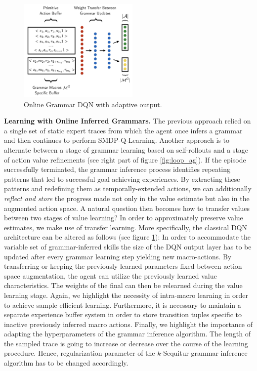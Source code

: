 \documentclass[colorinlistoftodos]{article}
\theoremstyle{definition}
\begin{document}
\begin{figure}
  \begin{center}
    \includegraphics[width=0.52\textwidth]{figures/ag_dqn_buffer}
  \end{center}
  \caption{Online Grammar DQN with adaptive output.}
  \label{fig:online_ag_dqn}
\end{figure}

\textbf{Learning with Online Inferred Grammars.} The previous approach relied on a single set of static expert traces from which the agent once infers a grammar and then continues to perform SMDP-Q-Learning. Another approach is to alternate between a stage of grammar learning based on self-rollouts and a stage of action value refinements (see right part of figure \ref{fig:loop_ag}). If the episode successfully terminated, the grammar inference process identifies repeating patterns that led to successful goal achieving experiences. By extracting these patterns and redefining them as temporally-extended actions, we can additionally \textit{reflect and store} the progress made not only in the value estimate but also in the augmented action space. 
A natural question then becomes how to transfer values between two stages of value learning? In order to approximately preserve value estimates, we make use of transfer learning. 
More specifically, the classical DQN architecture can be altered as follows (see figure \ref{fig:online_ag_dqn}): In order to accommodate the variable set of grammar-inferred skills the size of the DQN output layer has to be updated after every grammar learning step yielding new macro-actions. By transferring or keeping the previously learned parameters fixed between action space augmentation, the agent can utilize the previously learned value characteristics. The weights of the final can then be relearned during the value learning stage. Again, we highlight the necessity of intra-macro learning in order to achieve sample efficient learning.
Furthermore, it is necessary to maintain a separate experience buffer system in order to store transition tuples specific to inactive previously inferred macro actions.  
Finally, we highlight the importance of adapting the hyperparameters of the grammar inference algorithm. The length of the sampled trace is going to increase or decrease over the course of the learning procedure. Hence, regularization parameter of the $k$-Sequitur grammar inference algorithm has to be changed accordingly.
\end{document}
